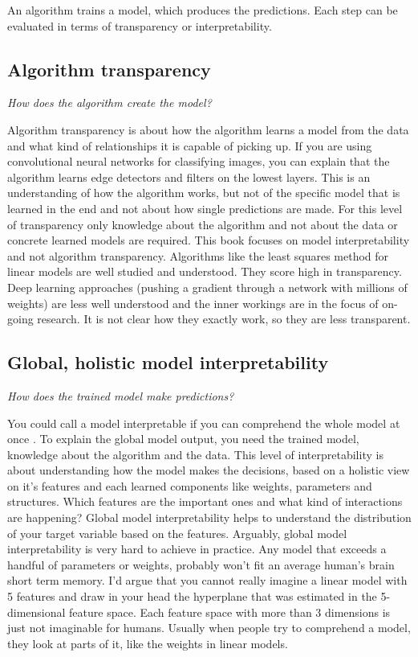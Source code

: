 \documentclass[12pt,]{krantz}
\theoremstyle{definition}
\theoremstyle{definition}
\theoremstyle{definition}
\theoremstyle{remark}
\begin{document}
An algorithm trains a model, which produces the predictions. Each step
can be evaluated in terms of transparency or interpretability.

\subsection{Algorithm transparency}\label{algorithm-transparency}

\emph{How does the algorithm create the model?}

Algorithm transparency is about how the algorithm learns a model from
the data and what kind of relationships it is capable of picking up. If
you are using convolutional neural networks for classifying images, you
can explain that the algorithm learns edge detectors and filters on the
lowest layers. This is an understanding of how the algorithm works, but
not of the specific model that is learned in the end and not about how
single predictions are made. For this level of transparency only
knowledge about the algorithm and not about the data or concrete learned
models are required. This book focuses on model interpretability and not
algorithm transparency. Algorithms like the least squares method for
linear models are well studied and understood. They score high in
transparency. Deep learning approaches (pushing a gradient through a
network with millions of weights) are less well understood and the inner
workings are in the focus of on-going research. It is not clear how they
exactly work, so they are less transparent.

\subsection{Global, holistic model
interpretability}\label{global-holistic-model-interpretability}

\emph{How does the trained model make predictions?}

You could call a model interpretable if you can comprehend the whole
model at once \citep{Lipton2016}. To explain the global model output,
you need the trained model, knowledge about the algorithm and the data.
This level of interpretability is about understanding how the model
makes the decisions, based on a holistic view on it's features and each
learned components like weights, parameters and structures. Which
features are the important ones and what kind of interactions are
happening? Global model interpretability helps to understand the
distribution of your target variable based on the features. Arguably,
global model interpretability is very hard to achieve in practice. Any
model that exceeds a handful of parameters or weights, probably won't
fit an average human's brain short term memory. I'd argue that you
cannot really imagine a linear model with 5 features and draw in your
head the hyperplane that was estimated in the 5-dimensional feature
space. Each feature space with more than 3 dimensions is just not
imaginable for humans. Usually when people try to comprehend a model,
they look at parts of it, like the weights in linear models.
\end{document}
